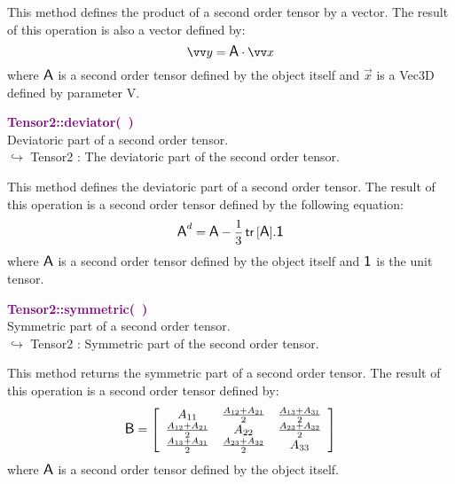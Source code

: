This method defines the product of a second order tensor by a vector.
The result of this operation is also a vector defined by:
\begin{equation*}
\overrightarrow{y} = \A \cdot \overrightarrow{x}
\end{equation*}
where $\mbox{\large\ensuremath{\mathsf{A}}}$ is a second order tensor defined by the object itself and $\overrightarrow{x}$ is a Vec3D defined by parameter V.

\textcolor{purple}{\textbf{Tensor2::deviator(~)}}\label{Tensor2::deviator()}\\
Deviatoric part of a second order tensor.\\ \hspace*{10mm}$\hookrightarrow$ Tensor2 : The deviatoric part of the second order tensor.

This method defines the deviatoric part of a second order tensor.
The result of this operation is a second order tensor defined by the following equation:
\begin{equation*}
\mbox{\large\ensuremath{\mathsf{A}}}^d=\mbox{\large\ensuremath{\mathsf{A}}}-\frac{1}{3}\mbox{\ensuremath{\mathsf{\,tr\,}}}[\mbox{\large\ensuremath{\mathsf{A}}}].\mbox{\large\ensuremath{\mathsf{1}}}
\end{equation*}
where $\mbox{\large\ensuremath{\mathsf{A}}}$ is a second order tensor defined by the object itself and $\mbox{\large\ensuremath{\mathsf{1}}}$ is the unit tensor.

\textcolor{purple}{\textbf{Tensor2::symmetric(~)}}\label{Tensor2::symmetric()}\\
Symmetric part of a second order tensor.\\ \hspace*{10mm}$\hookrightarrow$ Tensor2 : Symmetric part of the second order tensor.

This method returns the symmetric part of a second order tensor.
The result of this operation is a second order tensor defined by:
\begin{equation*}
\mbox{\large\ensuremath{\mathsf{B}}} = \left[\begin{array}{ccc}
 A_{11} & \frac{A_{12} + A_{21}}{2} & \frac{A_{13} + A_{31}}{2}\\
 \frac{A_{12} + A_{21}}{2} & A_{22} & \frac {A_{23} + A_{32}}{2}\\
 \frac{A_{13} + A_{31}}{2} & \frac {A_{23} + A_{32}}{2} & A_{33}\end{array}
\right]
\end{equation*}
where $\mbox{\large\ensuremath{\mathsf{A}}}$ is a second order tensor defined by the object itself.

